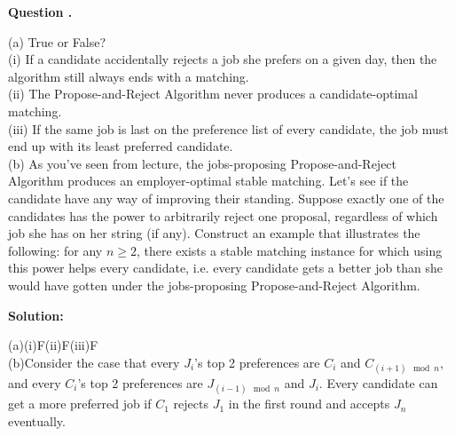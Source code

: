\documentclass[12pt]{article}
\newcounter{questionnumber}
\newenvironment{question}[1][]{\stepcounter{questionnumber}\par\noindent\textbf{Question \thequestionnumber. #1}\par}{\par}
\newenvironment{solution}{\par\noindent\textbf{Solution:}\par}{\par\vspace{1em}}
\begin{document}
\begin{question}
    \noindent
    (a) True or False?\\
    \indent (i) If a candidate accidentally rejects a job she prefers on a given day, then the algorithm still always ends with a matching.\\
    \indent (ii) The Propose-and-Reject Algorithm never produces a candidate-optimal matching.\\
    \indent (iii) If the same job is last on the preference list of every candidate, the job must end up with its least preferred candidate.\\
    (b) As you've seen from lecture, the jobs-proposing Propose-and-Reject Algorithm produces an employer-optimal stable matching. Let's see if the candidate have any way of improving their standing. Suppose exactly one of the candidates has the power to arbitrarily reject one proposal, regardless of which job she has on her string (if any). Construct an example that illustrates the following: for any $n \geq 2$, there exists a stable matching instance for which using this power helps every candidate, i.e. every candidate gets a better job than she would have gotten under the jobs-proposing Propose-and-Reject Algorithm.
\end{question}
\begin{solution}
    \noindent
    (a)(i)F(ii)F(iii)F\\
    (b)Consider the case that every $J_i$'s top 2 preferences are $C_i$ and $C_{(i+1)\mod n}$,
    and every $C_i$'s top 2 preferences are $J_{(i-1)\mod n}$ and $J_i$.
    Every candidate can get a more preferred job if $C_1$ rejects $J_1$ in the first round and accepts $J_n$ eventually.
\end{solution}
\end{document}
